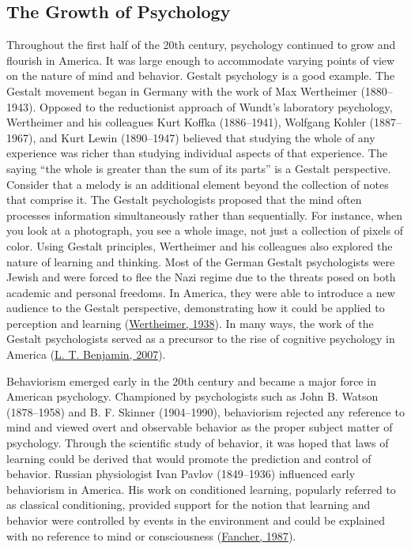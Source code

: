 \documentclass[
]{krantz}
\begin{document}
\hypertarget{the-growth-of-psychology}{%
\subsection*{The Growth of Psychology}\label{the-growth-of-psychology}}


Throughout the first half of the 20th century, psychology continued to grow and flourish in America. It was large enough to accommodate varying points of view on the nature of mind and behavior. Gestalt psychology is a good example. The Gestalt movement began in Germany with the work of Max Wertheimer (1880--1943). Opposed to the reductionist approach of Wundt's laboratory psychology, Wertheimer and his colleagues Kurt Koffka (1886--1941), Wolfgang Kohler (1887--1967), and Kurt Lewin (1890--1947) believed that studying the whole of any experience was richer than studying individual aspects of that experience. The saying ``the whole is greater than the sum of its parts'' is a Gestalt perspective. Consider that a melody is an additional element beyond the collection of notes that comprise it. The Gestalt psychologists proposed that the mind often processes information simultaneously rather than sequentially. For instance, when you look at a photograph, you see a whole image, not just a collection of pixels of color. Using Gestalt principles, Wertheimer and his colleagues also explored the nature of learning and thinking. Most of the German Gestalt psychologists were Jewish and were forced to flee the Nazi regime due to the threats posed on both academic and personal freedoms. In America, they were able to introduce a new audience to the Gestalt perspective, demonstrating how it could be applied to perception and learning (\protect\hyperlink{ref-wertheimer1938}{Wertheimer, 1938}). In many ways, the work of the Gestalt psychologists served as a precursor to the rise of cognitive psychology in America (\protect\hyperlink{ref-benjamin2007}{L. T. Benjamin, 2007}).

Behaviorism emerged early in the 20th century and became a major force in American psychology. Championed by psychologists such as John B. Watson (1878--1958) and B. F. Skinner (1904--1990), behaviorism rejected any reference to mind and viewed overt and observable behavior as the proper subject matter of psychology. Through the scientific study of behavior, it was hoped that laws of learning could be derived that would promote the prediction and control of behavior. Russian physiologist Ivan Pavlov (1849--1936) influenced early behaviorism in America. His work on conditioned learning, popularly referred to as classical conditioning, provided support for the notion that learning and behavior were controlled by events in the environment and could be explained with no reference to mind or consciousness (\protect\hyperlink{ref-fancher1987}{Fancher, 1987}).
\end{document}
